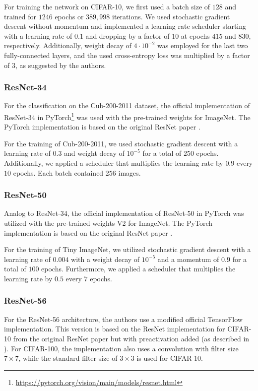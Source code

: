 For training the network on CIFAR-10, we first used a batch size of $128$ and trained for $1246$ epochs or $389,998$ iterations. We used stochastic gradient descent without momentum and implemented a learning rate scheduler starting with a learning rate of $0.1$ and dropping by a factor of $10$ at epochs $415$ and $830$, respectively. Additionally, weight decay of $4\cdot 10^{-2}$ was employed for the last two fully-connected layers, and the used cross-entropy loss was multiplied by a factor of $3$, as suggested by the authors.

\subsubsection{ResNet-34}\label{resnet34_model}
For the classification on the Cub-200-2011 dataset, the official implementation of ResNet-34 in PyTorch\footnote{\url{https://pytorch.org/vision/main/models/resnet.html}\label{note1}} was used with the pre-trained weights for ImageNet. The PyTorch implementation is based on the original ResNet paper \cite{he2016b}.

For the training of Cub-200-2011, we used stochastic gradient descent with a learning rate of $0.3$ and weight decay of $10^{-5}$ for a total of $250$ epochs. Additionally, we applied a scheduler that multiplies the learning rate by $0.9$ every $10$ epochs. Each batch contained $256$ images.

\subsubsection{ResNet-50}\label{resnet50_model}
Analog to ResNet-34, the official implementation of ResNet-50 in PyTorch was utilized with the pre-trained weights V2 for ImageNet. The PyTorch implementation is based on the original ResNet paper \cite{he2016b}.

For the training of Tiny ImageNet, we utilized stochastic gradient descent with a learning rate of $0.004$ with a weight decay of $10^{-5}$ and a momentum of $0.9$ for a total of $100$ epochs. Furthermore, we applied a scheduler that multiplies the learning rate by $0.5$ every $7$ epochs.

\subsubsection{ResNet-56}\label{resnet56_model}
For the ResNet-56 architecture, the authors use a modified official TensorFlow implementation. This version is based on the ResNet implementation for CIFAR-10 from the original ResNet paper \cite{he2016b} but with preactivation added (as described in \cite{he2016}). For CIFAR-100, the implementation also uses a convolution with filter size $7\times7$, while the standard filter size of $3\times3$ is used for CIFAR-10.

